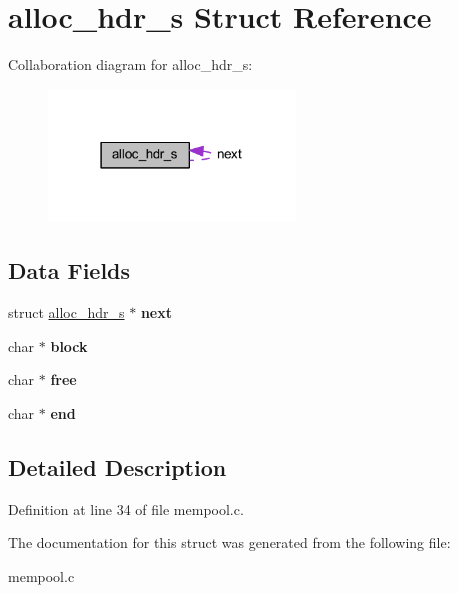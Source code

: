 \hypertarget{structalloc__hdr__s}{}\section{alloc\+\_\+hdr\+\_\+s Struct Reference}
\label{structalloc__hdr__s}


Collaboration diagram for alloc\+\_\+hdr\+\_\+s\+:
\nopagebreak
\begin{figure}[H]
\begin{center}
\leavevmode
\includegraphics[width=186pt]{d5/ded/structalloc__hdr__s__coll__graph}
\end{center}
\end{figure}
\subsection*{Data Fields}
\begin{DoxyCompactItemize}
\item 
\mbox{\label{structalloc__hdr__s_a076f9357e38858390e374d53df4172cd}} 
struct \hyperlink{structalloc__hdr__s}{alloc\+\_\+hdr\+\_\+s} $\ast$ {\bfseries next}
\item 
\mbox{\label{structalloc__hdr__s_a0ab3db6bc6aa84e89b7d059a84002be5}} 
char $\ast$ {\bfseries block}
\item 
\mbox{\label{structalloc__hdr__s_acd2366bb6b4d8417d8c338ddb0f3c0ce}} 
char $\ast$ {\bfseries free}
\item 
\mbox{\label{structalloc__hdr__s_ad7df3e66f0d081eb6a27998bd1e681e7}} 
char $\ast$ {\bfseries end}
\end{DoxyCompactItemize}


\subsection{Detailed Description}


Definition at line 34 of file mempool.\+c.



The documentation for this struct was generated from the following file\+:\begin{DoxyCompactItemize}
\item 
mempool.\+c\end{DoxyCompactItemize}
